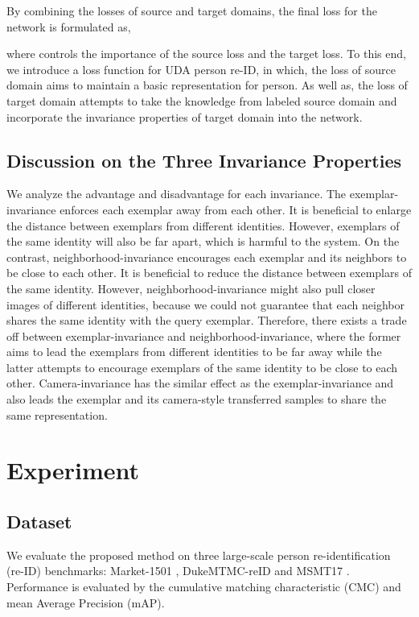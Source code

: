 \documentclass[10pt,twocolumn,letterpaper]{article}
\begin{document}
By combining the losses of source and target domains, the final loss for the network is formulated as,

where  controls the importance of the source loss and the target loss. To this end, we introduce a loss function for UDA person re-ID, in which, the loss of source domain aims to maintain a basic representation for person. As well as, the loss of target domain attempts to take the knowledge from labeled source domain and incorporate the invariance properties of target domain into the network.

\subsection{Discussion on the Three Invariance Properties}
We analyze the advantage and disadvantage for each invariance. The exemplar-invariance enforces each exemplar away from each other. 
It is beneficial to enlarge the distance between exemplars from different identities. 
However, exemplars of the same identity will also be far apart, which is harmful to the system. 
On the contrast, neighborhood-invariance encourages each exemplar and its neighbors to be close to each other. 
It is beneficial to reduce the distance between exemplars of the same identity. 
However, neighborhood-invariance might also pull closer images of different identities, because we could not guarantee that each neighbor shares the same identity with the query exemplar. Therefore, there exists a trade off between exemplar-invariance and neighborhood-invariance, where the former aims to lead the exemplars from different identities to be far away while the latter attempts to encourage exemplars of the same identity to be close to each other. Camera-invariance has the similar effect as the exemplar-invariance and also leads the exemplar and its camera-style transferred samples to share the same representation.



\section{Experiment}

\subsection{Dataset} We evaluate the proposed method on three large-scale person re-identification (re-ID) benchmarks: Market-1501 \cite{zheng2015scalable}, DukeMTMC-reID \cite{ristani2016performance,zheng2017unlabeled} and MSMT17 \cite{wei2018person}. Performance is evaluated by the cumulative matching
characteristic (CMC) and mean Average Precision (mAP).
\end{document}
